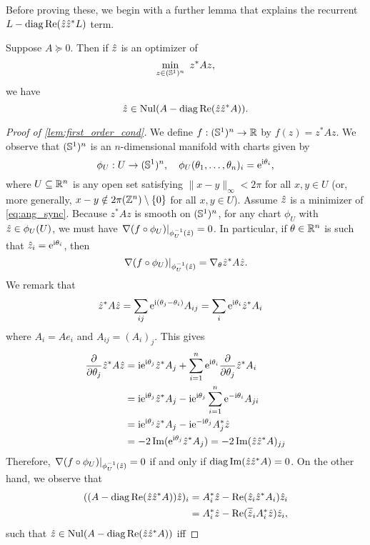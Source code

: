 Before proving these, we begin with a further lemma that explains the recurrent $L - \operatorname{diag} \operatorname{Re} (\hat{z} \hat{z}^* L)$ term.

\begin{lemma}\label{lem:first_order_cond}
  Suppose $A \succeq 0$.  Then if $\hat{z}$ is an optimizer of \[\min\limits_{z \in (\mathbb{S}^1)^n} \ z^* A z,\] we have \[\hat{z} \in \operatorname{Nul} (A - \operatorname{diag} \operatorname{Re} (\hat{z} \hat{z}^* A)).\]
\end{lemma}

\begin{proof}[Proof of \cref{lem:first_order_cond}]
  We define $f : (\mathbb{S}^1)^n \to \mathbb{R}$ by $f(z) = z^* A z$.  We observe that $(\mathbb{S}^1)^n$ is an $n$-dimensional manifold with charts given by \[\phi_U : U \to (\mathbb{S}^1)^n,\quad \phi_U(\theta_1, \ldots, \theta_n)_i = \mathrm{e}^{\mathrm{i} \theta_i},\] where $U \subseteq \mathbb{R}^n$ is any open set satisfying $\lVert x - y\rVert_\infty < 2 \pi$ for all $x, y \in U$ (or, more generally, $x - y \notin 2 \pi (\mathbb{Z}^n) \setminus \{0\}$ for all $x, y \in U$).  Assume $\hat{z}$ is a minimizer of \eqref{eq:ang_sync}.  Because $z^* A z$ is smooth on $(\mathbb{S}^1)^n$, for any chart $\phi_U$ with $\hat{z} \in \phi_U(U)$, we must have $\left.\nabla (f \circ \phi_U)\right|_{\phi_U^{-1}(\hat{z})} = 0$.  In particular, if $\theta \in \mathbb{R}^n$ is such that $\hat{z}_i = \mathrm{e}^{\mathrm{i} \theta_i}$, then \[\left.\nabla (f \circ \phi_U)\right|_{\phi_U^{-1}(\hat{z})} = \nabla_\theta \hat{z}^* A \hat{z}.\]  We remark that \begin{align*} \hat{z}^* A \hat{z} &= \sum_{ij} \mathrm{e}^{\mathrm{i} (\theta_j - \theta_i)} A_{ij} = \sum_i \mathrm{e}^{\mathrm{i} \theta_i} \hat{z}^* A_i \end{align*} where $A_i = A e_i$ and $A_{ij} = (A_i)_j$.  This gives \begin{align*} \frac{\partial}{\partial \theta_j} \hat{z}^* A \hat{z} &= \mathrm{i} \mathrm{e}^{\mathrm{i} \theta_j} \hat{z}^* A_j + \sum_{i = 1}^n \mathrm{e}^{\mathrm{i} \theta_i} \frac{\partial}{\partial \theta_j} \hat{z}^* A_i \\ &= \mathrm{i} \mathrm{e}^{\mathrm{i} \theta_j} \hat{z}^* A_j - \mathrm{i} \mathrm{e}^{\mathrm{i} \theta_j} \sum_{i = 1}^n \mathrm{e}^{-\mathrm{i} \theta_i} A_{ji} \\ &= \mathrm{i} \mathrm{e}^{\mathrm{i} \theta_j} \hat{z}^* A_j - \mathrm{i}\mathrm{e}^{-\mathrm{i} \theta_j} A_j^* \hat{z} \\ &= -2 \operatorname{Im}(\mathrm{e}^{\mathrm{i} \theta_j} \hat{z}^* A_j) = -2 \operatorname{Im} (\hat{z} \hat{z}^* A)_{jj}\end{align*}  Therefore, $\left.\nabla (f \circ \phi_U)\right|_{\phi_U^{-1}(\hat{z})} = 0$ if and only if $\operatorname{diag} \operatorname{Im}(\hat{z} \hat{z}^* A) = 0$.  On the other hand, we observe that \begin{align*} ((A - \operatorname{diag} \operatorname{Re}(\hat{z} \hat{z}^* A)) \hat{z})_i &= A_i^* \hat{z} - \operatorname{Re}(\hat{z}_i \hat{z}^* A_i) \hat{z}_i \\ &= A_i^* \hat{z} - \operatorname{Re}(\overline{\hat{z}}_i A_i^* \hat{z}) \hat{z}_i,\end{align*} such that $\hat{z} \in \operatorname{Nul}(A - \operatorname{diag} \operatorname{Re}(\hat{z} \hat{z}^* A))$ iff

\end{proof}
